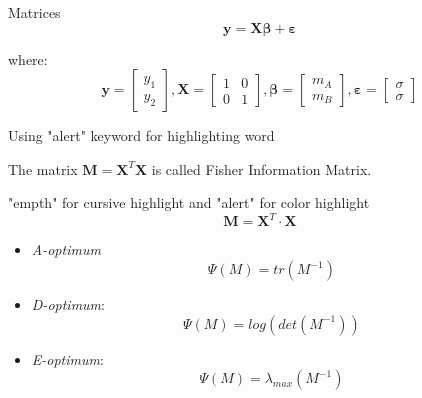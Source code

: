 \documentclass{beamer}
\begin{document}
\begin{frame} {Matrices}
    \begin{equation*}
        \mathbf{y}=\mathbf{X} \mathbf{\beta} + \mathbf{\varepsilon}
    \end{equation*}
    
    where:
    \begin{equation*}
        \mathbf{y} = \left[\begin{matrix} y_1 \\ y_2 \end{matrix}\right], 
        \mathbf{X} = \left[\begin{matrix} 1 & 0 \\ 0 & 1 \end{matrix} \right],
        \mathbf{\beta} = \left[\begin{matrix} m_A \\ m_B \end{matrix}\right], 
        \mathbf{\varepsilon} = \left[\begin{matrix} \sigma \\ \sigma \end{matrix}\right]
    \end{equation*}
    
\end{frame}


\begin{frame} {Using "alert" keyword for highlighting word}
   
The matrix \alert{$\mathbf{M}=\mathbf{X}^T\mathbf{X}$} is called \alert{Fisher Information Matrix}.

\end{frame}


\begin{frame}{"empth" for cursive highlight and "alert" for color highlight}
$$ \mathbf{M} = \mathbf{X}^T \cdot \mathbf{X} $$
  \begin{itemize}
      \item \alert{\emph{A-optimum} $$\Psi(M) = tr(M^{-1})$$}
      
      \item \emph{D-optimum}:  $$\Psi(M) =  log(det(M^{-1}))$$
      
      \item \emph{E-optimum}: $$\Psi(M) = \lambda_{max}(M^{-1})$$
      
  \end{itemize}
\end{frame}
\end{document}
